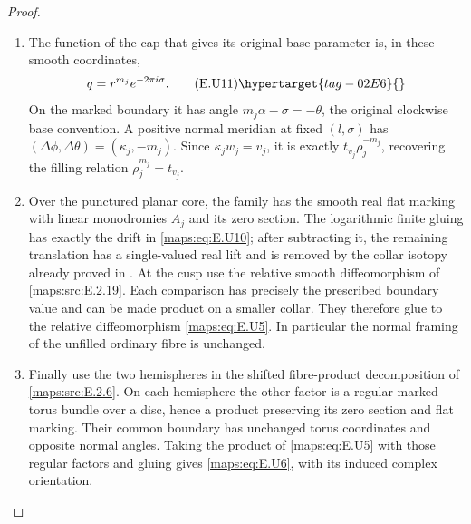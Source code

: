 \begin{proof}
\begin{enumerate}[label={$\langle1\rangle$\arabic*.},leftmargin=*]
\item The function of the cap that gives its original base parameter
is, in these smooth coordinates,
\[
                         q=r^{m_j}e^{-2\pi i\sigma}.
 \tag{E.U11}\hypertarget{tag-02E6}{}\label{maps:eq:E.U11}
\]
On the marked boundary it has angle
$m_j\alpha-\sigma=-\theta$, the original clockwise base
convention.  A positive normal meridian at fixed
$(l,\sigma)$ has $(\Delta\phi,\Delta\theta)=(\kappa_j,-m_j)$.
Since $\kappa_jw_j=v_j$, it is exactly $t_{v_j}\rho_j^{-m_j}$,
recovering the filling relation
$\rho_j^{m_j}=t_{v_j}$.

\item Over the punctured planar core, the family has the
smooth real flat marking with linear monodromies $A_j$ and
its zero section.  The logarithmic finite gluing has exactly
the drift in \eqref{maps:eq:E.U10}; after subtracting it, the remaining
translation has a single-valued real lift and is removed by
the collar isotopy already proved in .    At the cusp use the relative smooth diffeomorphism of \ref{maps:src:E.2.19}.  Each comparison
has precisely the prescribed boundary value and can be
made product on a smaller collar.  They therefore glue to
the relative diffeomorphism \eqref{maps:eq:E.U5}.  In particular the
normal framing of the unfilled ordinary fibre is unchanged.

\item Finally use the two hemispheres in the shifted
fibre-product decomposition of \ref{maps:src:E.2.6}.  On each hemisphere
the other factor is a regular marked torus bundle over a
disc, hence a product preserving its zero section and flat
marking.  Their common boundary has unchanged torus
coordinates and opposite normal angles.  Taking the product
of \eqref{maps:eq:E.U5} with those regular factors and gluing gives
\eqref{maps:eq:E.U6}, with its induced complex orientation.  
\end{enumerate}
\end{proof}



